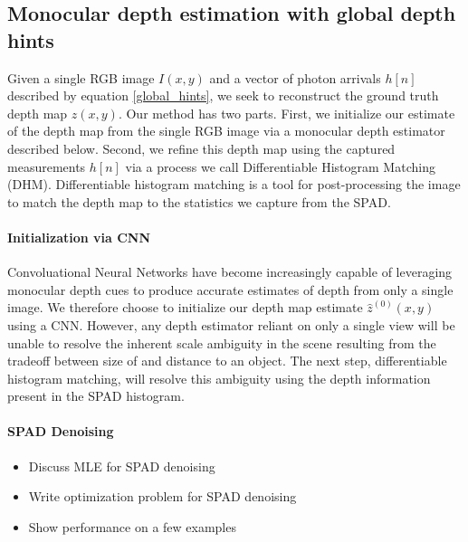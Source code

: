 \subsection{Monocular depth estimation with global depth hints}
Given a single RGB image $I(x,y)$ and a vector of photon arrivals $h[n]$
described by equation \ref{global_hints}, we seek to
reconstruct the ground truth depth map $z(x,y)$.
Our method has two parts. First, we initialize our estimate of the depth map from the single RGB
image via a monocular depth estimator described below. Second, we refine this depth map using
the captured measurements $h[n]$ via a process we call Differentiable Histogram
Matching (DHM).
Differentiable histogram matching is a tool for post-processing the image to
match the depth map to the statistics we capture from the SPAD.

\paragraph{Initialization via CNN}
Convoluational Neural Networks have become increasingly capable of leveraging
monocular depth cues to produce accurate estimates of depth
from only a single image. We therefore choose to initialize our depth map
estimate $\hat z^{(0)}(x,y)$ using
a CNN. However, any depth estimator reliant on only a single
view will be unable to resolve the inherent scale ambiguity in the scene resulting
from the tradeoff between size of and distance to an object. The next step,
differentiable histogram matching, will resolve this ambiguity using the depth
information present in the SPAD histogram.

\paragraph{SPAD Denoising}
\begin{itemize}
  \item Discuss MLE for SPAD denoising
  \item Write optimization problem for SPAD denoising
  \item Show performance on a few examples 
\end{itemize}
